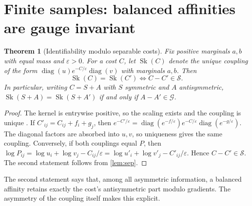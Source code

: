 \documentclass{article}
\theoremstyle{plain}
\newtheorem{theorem}{Theorem}[section]
\theoremstyle{definition}
\theoremstyle{remark}
\newcommand{\eps}{\varepsilon}
\newcommand{\1}{\mathbf{1}}
\newcommand{\diag}{\operatorname{diag}}
\newcommand{\Sep}{\mathcal{S}}
\newcommand{\Grad}{\mathcal{G}}
\newcommand{\Sk}{\operatorname{Sk}}
\begin{document}
\section{Finite samples: balanced affinities are gauge invariant}
\label{sec:finite}

\begin{theorem}[Identifiability modulo separable costs]
  \label{thm:identifiability}
  Fix positive marginals $a,b$ with equal mass and $\eps>0$. For a cost $C$,
  let $\Sk(C)$ denote the unique coupling of the form
  $\diag(u)e^{-C/\eps}\diag(v)$ with marginals $a,b$. Then
  \[
    \Sk(C)=\Sk(C') \iff C-C'\in\Sep .
  \]
  In particular, writing $C=S+A$ with $S$ symmetric and $A$ antisymmetric,
  $\Sk(S+A)=\Sk(S+A')$ if and only if $A-A'\in\Grad$.
\end{theorem}

\begin{proof}
  The kernel is entrywise positive, so the scaling exists and the coupling
  is unique \citep{sinkhorn1967concerning}. If $C'_{ij}=C_{ij}+f_i+g_j$, then
  $e^{-C'/\eps}=\diag(e^{-f/\eps})e^{-C/\eps}\diag(e^{-g/\eps})$. The
  diagonal factors are absorbed into $u,v$, so uniqueness gives the same
  coupling. Conversely, if both couplings equal $P$, then
  $\log P_{ij}=\log u_i+\log v_j-C_{ij}/\eps=\log u'_i+\log v'_j-C'_{ij}/\eps$.
  Hence $C-C'\in\Sep$. The second statement follows from \cref{lem:sep}.
\end{proof}

The second statement says that, among all asymmetric information, a
balanced affinity retains exactly the cost's antisymmetric part modulo
gradients. The asymmetry of the coupling itself makes this explicit.
\end{document}
